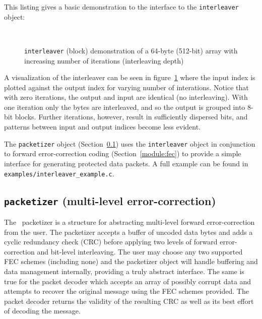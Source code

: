 This listing gives a basic demonstration to the interface to the
{\tt interleaver} object:


\begin{figure}
\centering
\mbox{
   \quad
   \quad
}
\mbox{
   \quad
   \quad
}
\caption{{\tt interleaver} (block) demonstration of a 64-byte (512-bit) array
with increasing number of iterations (interleaving depth)}
\label{fig:module:framing:interleaver:scatterplot}
\end{figure}

A visualization of the interleaver can be seen in
figure~\ref{fig:module:framing:interleaver:scatterplot}
where the input index is plotted against the output index for varying number
of interations.
Notice that with zero iterations, the output and input are identical (no
interleaving).
With one iteration only the bytes are interleaved, and so the output is
grouped into 8-bit blocks.
Further iterations, however, result in sufficiently dispersed bits, and
patterns between input and output indices become less evident.

The {\tt packetizer} object (Section~\ref{module:framing:packetizer}) uses the
{\tt interleaver} object in conjunction to forward error-correction coding
(Section~\ref{module:fec}) to provide a simple interface for generating
protected data packets.
A full example can be found in {\tt examples/interleaver\_example.c}.


%
%
\subsection{{\tt packetizer} (multi-level error-correction)}
\label{module:framing:packetizer}
The \liquid\ packetizer is a structure for abstracting multi-level forward
error-correction from the user.
The packetizer accepts a buffer of uncoded data bytes and adds a
cyclic redundancy check (CRC) before applying two levels of forward
error-correction and bit-level interleaving.
The user may choose any two supported FEC schemes (including none) and the
packetizer object will handle buffering and data management internally,
providing a truly abstract interface.
The same is true for the packet decoder which accepts an array
of possibly corrupt data and attempts to recover the original message using
the FEC schemes provided.
The packet decoder returns the validity of the resulting CRC as well as its
best effort of decoding the message.

